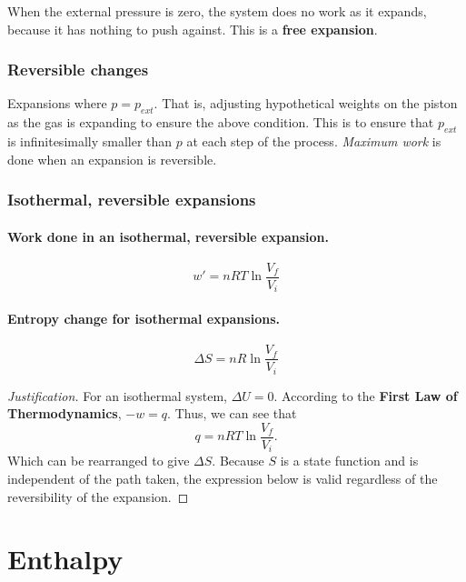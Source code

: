 \documentclass{article}
\numberwithin{theorem}{section}
\numberwithin{corollary}{section}
\numberwithin{postulate}{section}
\numberwithin{lemma}{section}
\numberwithin{definition}{section}
\newenvironment{justification} {\begin{proof}[Justification]} {\end{proof}}
\begin{document}
When the external pressure is zero, the system does no work as it expands,
because it has nothing to push against. This is a \textbf{free expansion}.

\subsubsection{Reversible changes}
Expansions where $p = p_{ext}$. That is, adjusting hypothetical weights on the
piston as the gas is expanding to ensure the above condition. This is to ensure
that $p_{ext}$ is infinitesimally smaller than $p$ at each step of the process.
\textit{Maximum work} is done when an expansion is reversible.

\subsubsection{Isothermal, reversible expansions}

\paragraph{Work done in an isothermal, reversible expansion. }

\begin{equation}
  w' = nRT\ln{\frac{V_f}{V_i}}
\end{equation}

\paragraph{Entropy change for isothermal expansions. }

\begin{equation}
  \Delta S = nR \ln{\frac{V_f}{V_i}}
\end{equation}

\begin{justification}
  For an isothermal system, $\Delta U = 0$. According to the \textbf{First Law of Thermodynamics}, $-w = q$. Thus, we can see that
  \begin{equation*}
      q = nRT\ln{\frac{V_f}{V_i}}.
  \end{equation*}
Which can be rearranged to give $\Delta S$. Because $S$ is a state function and is independent of the path taken, the expression below is valid
regardless of the reversibility of the expansion.
\end{justification}

\section{Enthalpy}
\end{document}
